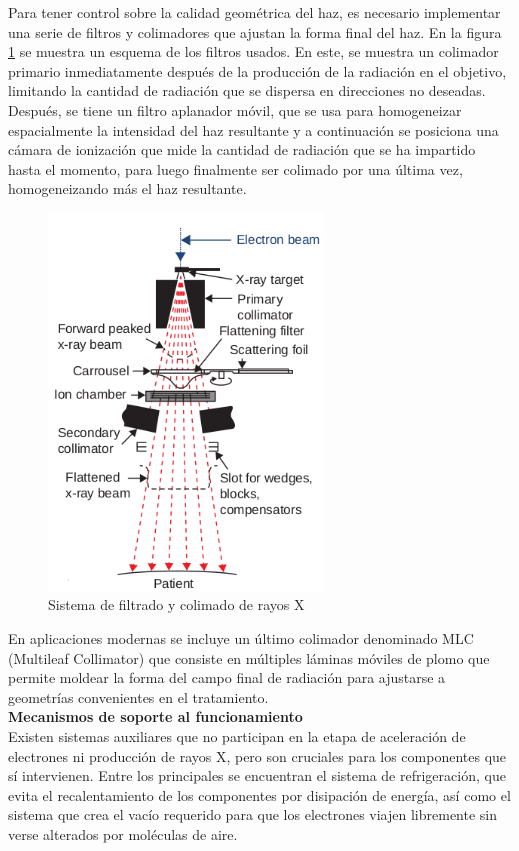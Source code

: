 Para tener control sobre la calidad geométrica del haz, es necesario implementar una serie de filtros y colimadores que ajustan la forma final del haz. En la figura \ref{fig:filtrosRayosX} se muestra un esquema de los filtros usados. En este, se muestra un colimador primario inmediatamente después de la producción de la radiación en el objetivo, limitando la cantidad de radiación que se dispersa en direcciones no deseadas. Después, se tiene un filtro aplanador móvil, que se usa para homogeneizar espacialmente la intensidad del haz resultante y a continuación se posiciona una cámara de ionización que mide la cantidad de radiación que se ha impartido hasta el momento, para luego finalmente ser colimado por una última vez, homogeneizando más el haz resultante.\\
\begin{figure}[H]
	\centering
	\includegraphics[width=0.7\linewidth, height=10cm]{images/filtros.png}
	\caption{Sistema de filtrado y colimado de rayos X\cite{khan2014the}}
	\label{fig:filtrosRayosX}
\end{figure}
En aplicaciones modernas se incluye un último colimador denominado MLC (Multileaf Collimator) que consiste en múltiples láminas móviles de plomo que permite moldear la forma del campo final de radiación para ajustarse a geometrías convenientes en el tratamiento\cite{Burman2002}.\\


\textbf{Mecanismos de soporte al funcionamiento}\\

Existen sistemas auxiliares que no participan en la etapa de aceleración de electrones ni producción de rayos X, pero son cruciales para los componentes que sí intervienen. Entre los principales se encuentran el sistema de refrigeración, que evita el recalentamiento de los componentes por disipación de energía, así como el sistema que crea el vacío requerido para que los electrones viajen libremente sin verse alterados por moléculas de aire.\\

